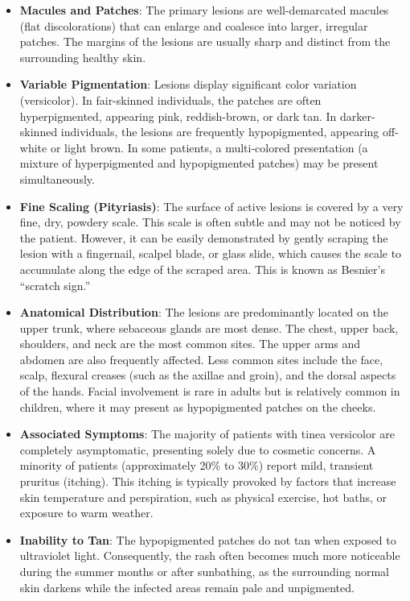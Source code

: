 \begin{itemize}
    \item \textbf{Macules and Patches}: The primary lesions are well-demarcated macules (flat discolorations) that can enlarge and coalesce into larger, irregular patches. The margins of the lesions are usually sharp and distinct from the surrounding healthy skin.
    \item \textbf{Variable Pigmentation}: Lesions display significant color variation (versicolor). In fair-skinned individuals, the patches are often hyperpigmented, appearing pink, reddish-brown, or dark tan. In darker-skinned individuals, the lesions are frequently hypopigmented, appearing off-white or light brown. In some patients, a multi-colored presentation (a mixture of hyperpigmented and hypopigmented patches) may be present simultaneously.
    \item \textbf{Fine Scaling (Pityriasis)}: The surface of active lesions is covered by a very fine, dry, powdery scale. This scale is often subtle and may not be noticed by the patient. However, it can be easily demonstrated by gently scraping the lesion with a fingernail, scalpel blade, or glass slide, which causes the scale to accumulate along the edge of the scraped area. This is known as Besnier's ``scratch sign.''
    \item \textbf{Anatomical Distribution}: The lesions are predominantly located on the upper trunk, where sebaceous glands are most dense. The chest, upper back, shoulders, and neck are the most common sites. The upper arms and abdomen are also frequently affected. Less common sites include the face, scalp, flexural creases (such as the axillae and groin), and the dorsal aspects of the hands. Facial involvement is rare in adults but is relatively common in children, where it may present as hypopigmented patches on the cheeks.
    \item \textbf{Associated Symptoms}: The majority of patients with tinea versicolor are completely asymptomatic, presenting solely due to cosmetic concerns. A minority of patients (approximately 20\% to 30\%) report mild, transient pruritus (itching). This itching is typically provoked by factors that increase skin temperature and perspiration, such as physical exercise, hot baths, or exposure to warm weather.
    \item \textbf{Inability to Tan}: The hypopigmented patches do not tan when exposed to ultraviolet light. Consequently, the rash often becomes much more noticeable during the summer months or after sunbathing, as the surrounding normal skin darkens while the infected areas remain pale and unpigmented.
\end{itemize}

